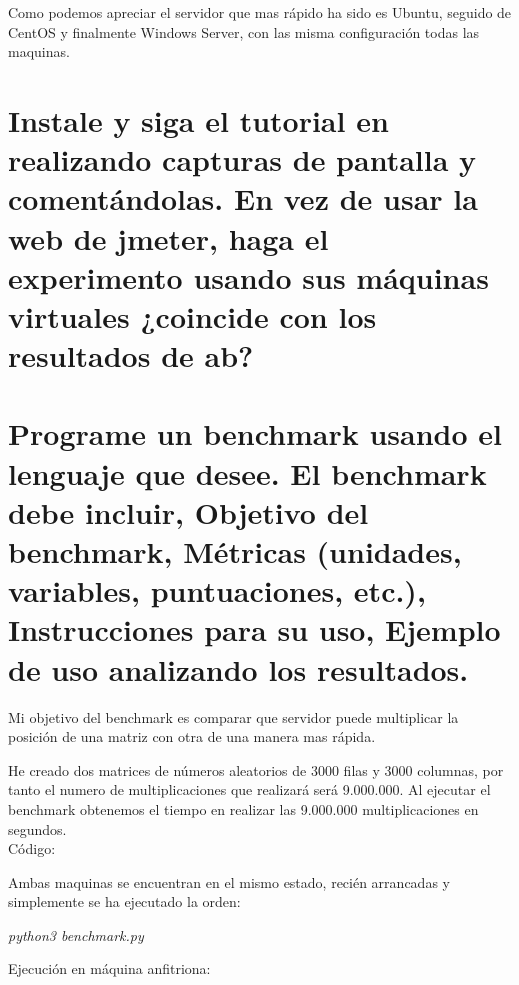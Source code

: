 Como podemos apreciar el servidor que mas rápido ha sido es Ubuntu, seguido de CentOS y finalmente Windows Server, con las misma configuración todas las maquinas.





\section[Cuestión 4]{Instale y siga el tutorial en	 realizando capturas de pantalla y comentándolas. En vez de usar la web de jmeter, haga el experimento usando sus máquinas virtuales ¿coincide con los resultados de ab?}

\section[Cuestión 5]{ Programe un benchmark usando el lenguaje que desee. El benchmark debe incluir, Objetivo del benchmark, Métricas (unidades, variables, puntuaciones, etc.), Instrucciones para su uso, Ejemplo de uso analizando los resultados.}

Mi objetivo del benchmark es comparar que servidor puede multiplicar la posición de una matriz con otra de una manera mas rápida.

He creado dos matrices de números aleatorios de 3000 filas y 3000 columnas, por tanto el numero de multiplicaciones que realizará será 9.000.000.
Al ejecutar el benchmark obtenemos el tiempo en realizar las 9.000.000 multiplicaciones en segundos.\\

Código:



Ambas maquinas se encuentran en el mismo estado, recién arrancadas y simplemente se ha ejecutado la orden:\\

\begin{center}
	\textit{python3 benchmark.py}
\end{center}

Ejecución en máquina anfitriona:

